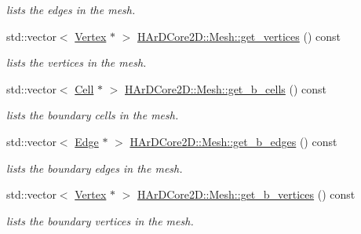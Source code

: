 \begin{DoxyCompactItemize}
\begin{DoxyCompactList}\small\item\em lists the edges in the mesh. \end{DoxyCompactList}\item 
\mbox{\label{group__Mesh_ga3ef9f9e205077bdb5c1057602bde5d70}} 
std\+::vector$<$ \hyperlink{classHArDCore2D_1_1Vertex}{Vertex} $\ast$ $>$ \hyperlink{group__Mesh_ga3ef9f9e205077bdb5c1057602bde5d70}{H\+Ar\+D\+Core2\+D\+::\+Mesh\+::get\+\_\+vertices} () const
\begin{DoxyCompactList}\small\item\em lists the vertices in the mesh. \end{DoxyCompactList}\item 
\mbox{\label{group__Mesh_gaf5cd4923da2e5abbe05c0f473e3b9c8f}} 
std\+::vector$<$ \hyperlink{classHArDCore2D_1_1Cell}{Cell} $\ast$ $>$ \hyperlink{group__Mesh_gaf5cd4923da2e5abbe05c0f473e3b9c8f}{H\+Ar\+D\+Core2\+D\+::\+Mesh\+::get\+\_\+b\+\_\+cells} () const
\begin{DoxyCompactList}\small\item\em lists the boundary cells in the mesh. \end{DoxyCompactList}\item 
\mbox{\label{group__Mesh_gad876c80b23ab0c0d490b5dc8a60172b4}} 
std\+::vector$<$ \hyperlink{classHArDCore2D_1_1Edge}{Edge} $\ast$ $>$ \hyperlink{group__Mesh_gad876c80b23ab0c0d490b5dc8a60172b4}{H\+Ar\+D\+Core2\+D\+::\+Mesh\+::get\+\_\+b\+\_\+edges} () const
\begin{DoxyCompactList}\small\item\em lists the boundary edges in the mesh. \end{DoxyCompactList}\item 
\mbox{\label{group__Mesh_ga32dead5e72501d5001fd83aaa7379173}} 
std\+::vector$<$ \hyperlink{classHArDCore2D_1_1Vertex}{Vertex} $\ast$ $>$ \hyperlink{group__Mesh_ga32dead5e72501d5001fd83aaa7379173}{H\+Ar\+D\+Core2\+D\+::\+Mesh\+::get\+\_\+b\+\_\+vertices} () const
\begin{DoxyCompactList}\small\item\em lists the boundary vertices in the mesh. \end{DoxyCompactList}\item 
\mbox{\label{group__Mesh_gab962f4a1a88c7f4910a5e555e01064f3}} 

\end{DoxyCompactItemize}
